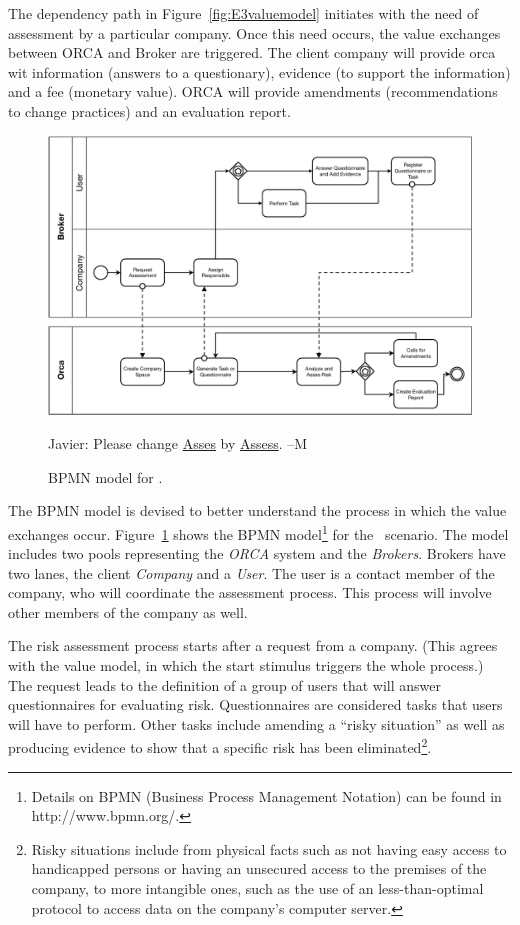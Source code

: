 The dependency path in Figure~\ref{fig:E3valuemodel} initiates with the need of assessment by a particular company. 
Once this need occurs, the value exchanges between ORCA and Broker are triggered. 
The client company will provide orca wit information (answers to a questionary), evidence (to support the information) and a fee (monetary value).
ORCA will provide amendments (recommendations to change practices) and an evaluation report. 

\begin{figure}[t]
\centering
\includegraphics[width=1.0\textwidth]{figs/BPMN_GCP.pdf}

{\color{red} Javier: Please change \underline{Asses} by \underline{Assess}. --M}
\caption{BPMN model for \FlyingPig.\label{fig:BPMNmodel}}
\end{figure}

The BPMN model is devised to better understand the process in which the value exchanges occur.
Figure~\ref{fig:BPMNmodel} shows the BPMN model\footnote{Details on BPMN (Business Process Management Notation) can be found in http://www.bpmn.org/.} for the \FlyingPig\ scenario. 
The model includes two pools representing the \textsl{ORCA} system and the \textsl{Brokers}. 
Brokers have two lanes, the client \textsl{Company} and a \textsl{User}. 
The user is a contact member of the company, who will coordinate the assessment process. 
This process will involve other members of the company as well.

The risk assessment process starts after a request from a company.
(This agrees with the value model, in which the start stimulus triggers the whole process.)
The request leads to the definition of a group of users that will answer questionnaires for evaluating risk.
Questionnaires are considered tasks that users will have to perform. 
Other tasks include amending a ``risky situation'' as well as producing evidence to show that a specific risk has been eliminated\footnote{Risky situations include from physical facts such as not having easy access to handicapped persons or having an unsecured access to the premises of the company, to more intangible ones, such as the use of an less-than-optimal protocol to access data on the company's computer server.}.

